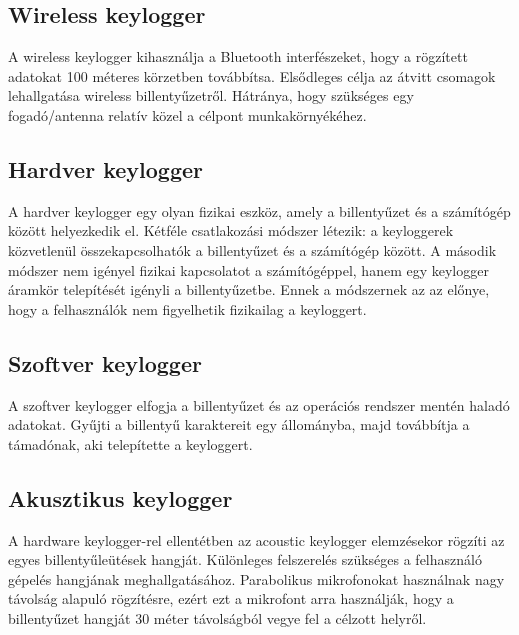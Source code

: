 \documentclass[12pt,a4paper,oneside]{report}
\begin{document}
\subsection{Wireless keylogger}
A wireless keylogger kihasználja a Bluetooth interfészeket, hogy a rögzített adatokat 100 méteres körzetben továbbítsa. Elsődleges célja az átvitt csomagok lehallgatása wireless billentyűzetről. Hátránya, hogy szükséges egy fogadó/antenna relatív közel a célpont munkakörnyékéhez.

\subsection{Hardver keylogger}
A hardver keylogger egy olyan fizikai eszköz, amely a billentyűzet és a számítógép között helyezkedik el. Kétféle csatlakozási módszer létezik: a keyloggerek közvetlenül összekapcsolhatók a billentyűzet és a számítógép között. A második módszer nem igényel fizikai kapcsolatot a számítógéppel, hanem egy keylogger áramkör telepítését igényli a billentyűzetbe. Ennek a módszernek az az előnye, hogy a felhasználók nem figyelhetik fizikailag a keyloggert.

\subsection{Szoftver keylogger}
A szoftver keylogger elfogja a billentyűzet és az operációs rendszer mentén haladó adatokat. Gyűjti a billentyű karaktereit egy állományba, majd továbbítja a támadónak, aki telepítette a keyloggert.

\subsection{Akusztikus keylogger}
A hardware keylogger-rel ellentétben az acoustic keylogger elemzésekor rögzíti az egyes billentyűleütések hangját. Különleges felszerelés szükséges a felhasználó gépelés hangjának meghallgatásához. Parabolikus mikrofonokat használnak nagy távolság alapuló rögzítésre, ezért ezt a mikrofont arra használják, hogy a billentyűzet hangját 30 méter távolságból vegye fel a célzott helyről.
\end{document}
